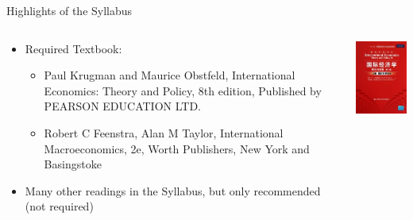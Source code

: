 \documentclass[10pt,hyperref={CJKbookmarks=true},xcolor=dvipsnames,aspectratio=169]{beamer}
\begin{document}
\begin{frame}{Highlights of the Syllabus}


\begin{columns}[onlytextwidth]
\begin{column}{0.55\textwidth}
\begin{itemize}
\item Required Textbook:

\begin{itemize}
\item Paul Krugman and Maurice Obstfeld, International Economics: Theory
and Policy, 8th edition, Published by PEARSON EDUCATION LTD.
\item Robert C Feenstra, Alan M Taylor, International Macroeconomics, 2e,
Worth Publishers, New York and Basingstoke
\end{itemize}
\item Many other readings in the Syllabus, but only recommended (not required) 
\end{itemize}

\end{column}
\begin{column}{0.35\textwidth}
\includegraphics[scale=1]{fig//krugman_textbook}
\end{column}
\end{columns}

\end{frame}
\end{document}
